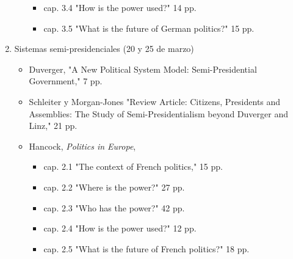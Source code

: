 \documentclass{article}
\begin{document}
\begin{enumerate}
\begin{itemize}
\begin{itemize}
\item cap. 3.4 "How is the power used?" 14 pp.
\item cap. 3.5 "What is the future of German politics?" 15 pp.
\end{itemize}
\end{itemize}
\item Sistemas semi-presidenciales  (20 y 25 de marzo)
\label{sec:orga4d7597}
\begin{itemize}
\item Duverger, "A New Political System Model: Semi-Presidential Government," 7 pp.
\item Schleiter y Morgan-Jones "Review Article: Citizens, Presidents and Assemblies: The Study of Semi-Presidentialism beyond Duverger and Linz," 21 pp.
\item Hancock, \emph{Politics in Europe}, 
\begin{itemize}
\item cap. 2.1 "The context of French politics," 15 pp.
\item cap. 2.2 "Where is the power?" 27 pp.
\item cap. 2.3 "Who has the power?" 42 pp.
\item cap. 2.4 "How is the power used?" 12 pp.
\item cap. 2.5 "What is the future of French politics?" 18 pp.
\end{itemize}
\end{itemize}
\end{enumerate}
\end{document}
